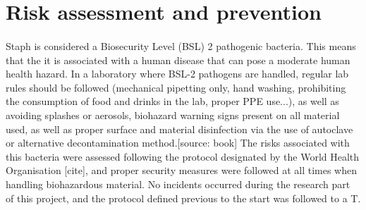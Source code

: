 \section{Risk assessment and prevention}
\paragraph{}Staph is considered a Biosecurity Level (BSL) 2 pathogenic bacteria. This means that the it is associated with a human disease that can pose a moderate human health hazard. In a laboratory where BSL-2 pathogens are handled, regular lab rules should be followed (mechanical pipetting only, hand washing, prohibiting the consumption of food and drinks in the lab, proper PPE use...), as well as avoiding splashes or aerosols, biohazard warning signs present on all material used, as well as proper surface and material disinfection via the use of autoclave or alternative decontamination method.[source: book] The risks associated with this bacteria were assessed following the protocol designated by the World Health Organisation [cite], and proper security measures were followed at all times when handling biohazardous material. No incidents occurred during the research part of this project, and the protocol defined previous to the start was followed to a T.